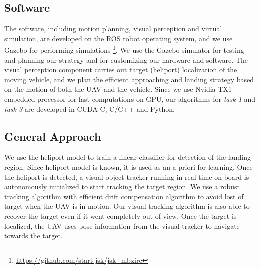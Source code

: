 \documentclass{standalone}
\begin{document}
\subsection{Software}

The software, including motion planning, visual perception and virtual simulation, are developed on the ROS robot operating system, and we use Gazebo for performing simulations \footnote{\url{https://github.com/start-jsk/jsk_mbzirc}}. We use the Gazebo simulator for testing and planning our strategy and for customizing our hardware and software. The visual perception component carries out target (heliport) localization of the moving vehicle, and we plan the efficient approaching and landing strategy based on the motion of both the UAV and the vehicle. Since we use Nvidia TX1 embedded processor for fast computations on GPU, our algorithms for \textit{task 1} and \textit{task 3} are developed in CUDA-C, C/C++ and Python. 



\subsection{General Approach}

We use the heliport model to train a linear classifier for detection of the landing region. Since heliport model is known, it is used as an a priori for learning. Once the heliport is detected, a visual object tracker running in real time on-board is autonomously initialized to start tracking the target region. We use a robust tracking algorithm with efficient drift compensation algorithm to avoid lost of target when the UAV is in motion. Our visual tracking algorithm is also able to recover the target even if it went completely out of view. Once the target is localized, the UAV uses pose information from the visual tracker to navigate towards the target. 
\end{document}
